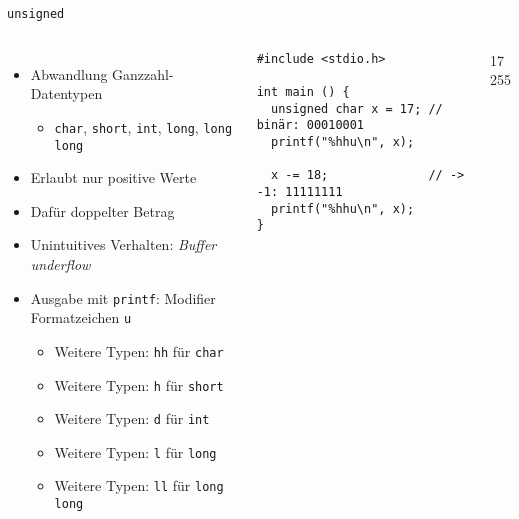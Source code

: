
\begin{frame}[fragile]{\texttt{unsigned}}
%
\begin{columns}[T]
\begin{itemize}
\item Abwandlung Ganzzahl-Datentypen
	\begin{itemize}
	\item \texttt{char}, \texttt{short}, \texttt{int}, \texttt{long},
		  \texttt{long long}
	\end{itemize}
\item Erlaubt nur positive Werte
\item Dafür doppelter Betrag
\item Unintuitives Verhalten: \emph{Buffer underflow}
\item Ausgabe mit \texttt{printf}: Modifier Formatzeichen \texttt{u}
	\begin{itemize}
	\item Weitere Typen: \texttt{hh} für \texttt{char}
	\item Weitere Typen: \texttt{h} für \texttt{short}
	\item Weitere Typen: \texttt{d} für \texttt{int}
	\item Weitere Typen: \texttt{l} für \texttt{long}
	\item Weitere Typen: \texttt{ll} für \texttt{long long}
	\end{itemize}
\end{itemize}
%
\vspace{-10pt}
\begin{codebox}
\begin{verbatim}
#include <stdio.h>

int main () {
  unsigned char x = 17; // binär: 00010001
  printf("%hhu\n", x);
  
  x -= 18;              // -> -1: 11111111
  printf("%hhu\n", x);
}
\end{verbatim}
\end{codebox}
%
\begin{cmdbox}[Ausgabe]
\scriptsize
17\\
255
\end{cmdbox}
\end{columns}
%
\end{frame}

